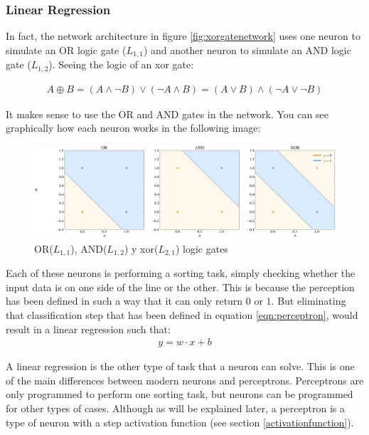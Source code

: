 \subsubsection{Linear Regression}

In fact, the network architecture in figure \ref{fig:xorgatenetwork} uses one neuron to simulate an OR logic gate ($L_{1,1}$) and another neuron to simulate an AND logic gate ($L_{1,2}$). Seeing the logic of an \acrshort{xor} gate:

\begin{eqnarray}
    A \oplus B = (A \land \neg B) \lor (\neg A \land B) = (A \lor B) \land (\neg A \lor \neg B)
\end{eqnarray}

It makes sense to use the OR and AND gates in the network. You can see graphically how each neuron works in the following image:
\begin{figure}[H]
    \centering
    \includegraphics[width=15cm]{images/state-of-art/regression/xor.png}
    \caption{OR($L_{1,1}$), AND($L_{1,2}$) y \acrshort{xor}($L_{2,1}$) logic gates}
    \label{fig:orandxorgraph}
\end{figure}

Each of these neurons is performing a sorting task, simply checking whether the input data is on one side of the line or the other. This is because the perception has been defined in such a way that it can only return $0$ or $1$. But eliminating that classification step that has been defined in equation \ref{eqn:perceptron}, would result in a linear regression such that:
\begin{eqnarray}
  y = w \cdot x + b
      \label{eqn:neuronsimple}
\end{eqnarray}

A linear regression is the other type of task that a neuron can solve. This is one of the main differences between modern neurons and perceptrons. Perceptrons are only programmed to perform one sorting task, but neurons can be programmed for other types of cases. Although as will be explained later, a perceptron is a type of neuron with a step activation function (see section \ref{activationfunction}).
\newline

